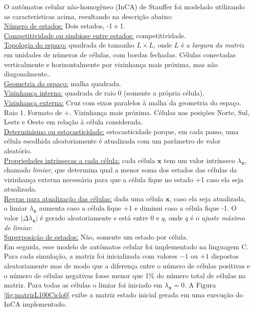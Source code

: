 \documentclass[
	12pt,				%
	openright,			%
	twoside,			%
	a4paper,			%
	english,			%
	french,				%
	spanish,			%
	brazil				%
	]{abntex2}
\begin{document}
O autômatos celular não-homogêneo (InCA) de Stauffer foi modelado utilizando as características acima, resultando na descrição abaixo:\\
\underline{Número de estados:} Dois estados, -1 e 1.\\
\underline{Competitividade ou simbiose entre estados:} competitividade.\\
\underline{Topologia do espaço:} quadrada de tamanho $L\times L$, onde $L$ é a \textit{largura da matriz} em unidades de números de células, com bordas fechadas. Células conectadas verticalmente e horizontalmente por vizinhança mais próxima, mas não diagonalmente..\\
\underline{Geometria do espaço:} malha quadrada.\\
\underline{Vizinhança interna:} quadrada de raio 0 (somente a própria célula).\\
\underline{Vizinhança externa:} Cruz com eixos paralelos à malha da geometria do espaço. Raio 1. Formato de +. Vizinhança mais próxima. Células nas posições Norte, Sul, Leste e Oeste em relação à célula considerada.\\
\underline{Determinismo ou estocasticidade:} estocasticidade porque, em cada passo, uma célula escolhida aleatoriamente é atualizada com um parâmetro de valor aleatório.\\
\underline{Propriedades intrínsecas a cada célula:} cada célula $\mathbf{x}$ tem um valor intrínseco $\lambda_\mathbf{x}$, chamado \textit{limiar}, que determina qual a menor soma dos estados das células da vizinhança externa necessária para que a célula fique no estado +1 caso ela seja atualizada.\\
\underline{Regras para atualização das células:}  dada uma célula $\mathbf{x}$, caso ela seja atualizada, o limiar $\lambda_\mathbf{x}$ aumenta caso a célula fique +1 e diminui caso a célula fique -1. O valor $|\Delta\lambda_\mathbf{x}|$ é gerado aleatoriamente e está entre $0$ e $q$, onde $q$ é o \textit{ajuste máximo de limiar}.\\
\underline{Superposição de estados:} Não, somente um estado por célula.\\


Em seguida, esse modelo de autômatos celular foi implementado na linguagem C. Para cada simulação, a matriz foi inicializada com valores $-1$ ou $+1$ dispostos aleatoriamente mas de modo que a diferença entre o número de células positivas e o número de células negativas fosse menor que 1\% do número total de células na matriz. Para todas as células o limiar foi iniciado em $\lambda_\mathbf{x} = 0$. A Figura \ref{fig:matrizL100Ciclo0} exibe a matriz estado inicial gerada em uma execução do InCA implementado.
\end{document}
